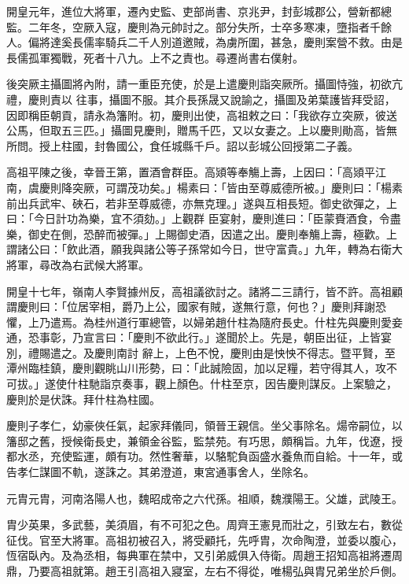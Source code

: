 \begin{pinyinscope}
 開皇元年，進位大將軍，遷內史監、吏部尚書、京兆尹，封彭城郡公，營新都總監。二年冬，空厥入寇，慶則為元帥討之。部分失所，士卒多寒凍，墮指者千餘人。偏將達奚長儒率騎兵二千人別道邀賊，為虜所圍，甚急，慶則案營不救。由是長儒孤軍獨戰，死者十八九。上不之責也。尋遷尚書右僕射。



 後突厥主攝圖將內附，請一重臣充使，於是上遣慶則詣突厥所。攝圖恃強，初欲亢禮，慶則責以
 往事，攝圖不服。其介長孫晟又說諭之，攝圖及弟葉護皆拜受詔，因即稱臣朝貢，請永為籓附。初，慶則出使，高祖敕之曰：「我欲存立突厥，彼送公馬，但取五三匹。」攝圖見慶則，贈馬千匹，又以女妻之。上以慶則勛高，皆無所問。授上柱國，封魯國公，食任城縣千戶。詔以彭城公回授第二子義。



 高祖平陳之後，幸晉王第，置酒會群臣。高熲等奉觴上壽，上因曰：「高熲平江南，虞慶則降突厥，可謂茂功矣。」楊素曰：「皆由至尊威德所被。」慶則曰：「楊素前出兵武牢、硤石，若非至尊威德，亦無克理。」遂與互相長短。御史欲彈之，上曰：「今日計功為樂，宜不須劾。」上觀群
 臣宴射，慶則進曰：「臣蒙賚酒食，令盡樂，御史在側，恐醉而被彈。」上賜御史酒，因遣之出。慶則奉觴上壽，極歡。上謂諸公曰：「飲此酒，願我與諸公等子孫常如今日，世守富貴。」九年，轉為右衛大將軍，尋改為右武候大將軍。



 開皇十七年，嶺南人李賢據州反，高祖議欲討之。諸將二三請行，皆不許。高祖顧謂慶則曰：「位居宰相，爵乃上公，國家有賊，遂無行意，何也？」慶則拜謝恐懼，上乃遣焉。為桂州道行軍總管，以婦弟趙什柱為隨府長史。什柱先與慶則愛妾通，恐事彰，乃宣言曰：「慶則不欲此行。」遂聞於上。先是，朝臣出征，上皆宴別，禮賜遣之。及慶則南討
 辭上，上色不悅，慶則由是怏怏不得志。暨平賢，至潭州臨桂鎮，慶則觀眺山川形勢，曰：「此誠險固，加以足糧，若守得其人，攻不可拔。」遂使什柱馳詣京奏事，觀上顏色。什柱至京，因告慶則謀反。上案驗之，慶則於是伏誅。拜什柱為柱國。



 慶則子孝仁，幼豪俠任氣，起家拜儀同，領晉王親信。坐父事除名。煬帝嗣位，以籓邸之舊，授候衛長史，兼領金谷監，監禁苑。有巧思，頗稱旨。九年，伐遼，授都水丞，充使監運，頗有功。然性奢華，以駱駝負函盛水養魚而自給。十一年，或告孝仁謀圖不軌，遂誅之。其弟澄道，東宮通事舍人，坐除名。



 元胄元胄，河南洛陽人也，魏昭成帝之六代孫。祖順，魏濮陽王。父雄，武陵王。



 胄少英果，多武藝，美須眉，有不可犯之色。周齊王憲見而壯之，引致左右，數從征伐。官至大將軍。高祖初被召入，將受顧托，先呼胄，次命陶澄，並委以腹心，恆宿臥內。及為丞相，每典軍在禁中，又引弟威俱入侍衛。周趙王招知高祖將遷周鼎，乃要高祖就第。趙王引高祖入寢室，左右不得從，唯楊弘與胄兄弟坐於戶側。




\end{pinyinscope}
